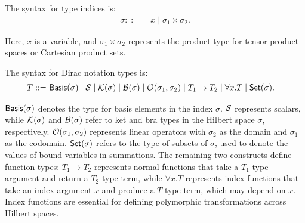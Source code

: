 \documentclass[runningheads]{llncs}
\begin{document}
\begin{definition}
    The syntax for type indices is:
    \begin{align*}
        \sigma ::=\ & x \mid \sigma_1 \times \sigma_2.
    \end{align*}
\end{definition}
Here, \( x \) is a variable, and \( \sigma_1 \times \sigma_2 \) represents the product type for tensor product spaces or Cartesian product sets.

\begin{definition}
    The syntax for Dirac notation types is:
    \begin{align*}
        T ::=\ & \mathsf{Basis}(\sigma) \mid \mathcal{S} \mid \mathcal{K}(\sigma) \mid \mathcal{B}(\sigma) \mid \mathcal{O}(\sigma_1, \sigma_2) \mid T_1 \to T_2 \mid \forall x.T \mid \mathsf{Set}(\sigma).
    \end{align*}
\end{definition}
\( \mathsf{Basis}(\sigma) \) denotes the type for basis elements in the index \( \sigma \).
\( \mathcal{S} \) represents scalars, while \( \mathcal{K}(\sigma) \) and \( \mathcal{B}(\sigma) \) refer to ket and bra types in the Hilbert space \( \sigma \), respectively.
\( \mathcal{O}(\sigma_1, \sigma_2) \) represents linear operators with \( \sigma_2 \) as the domain and \( \sigma_1 \) as the codomain.
\( \mathsf{Set}(\sigma) \) refers to the type of subsets of \( \sigma \), used to denote the values of bound variables in summations.
The remaining two constructs define function types: \( T_1 \to T_2 \) represents normal functions that take a \( T_1 \)-type argument and return a \( T_2 \)-type term, while \( \forall x. T \) represents index functions that take an index argument \( x \) and produce a \( T \)-type term, which may depend on \( x \).
Index functions are essential for defining polymorphic transformations across Hilbert spaces.
\end{document}

